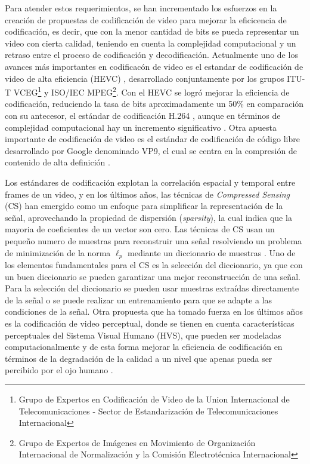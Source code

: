 Para atender estos requerimientos, se han incrementado los esfuerzos en la creaci\'on de propuestas de codificaci\'on de video para mejorar la eficicencia de codificaci\'on, es decir, que con la menor cantidad de bits se pueda representar un video con cierta calidad, teniendo en cuenta la complejidad computacional y un retraso entre el proceso de codificaci\'on y decodificaci\'on. Actualmente uno de los avances m\'as importantes en codificac\'on de video es el estandar de codificaci\'on de video de alta eficiencia (HEVC) \cite{hevc}, desarrollado conjuntamente por los grupos ITU-T VCEG\footnote{Grupo de Expertos en Codificaci\'on de Video de la Union Internacional de Telecomunicaciones - Sector de Estandarizaci\'on de Telecomunicaciones Internacional} y ISO/IEC MPEG\footnote{Grupo de Expertos de Im\'agenes en Movimiento de Organizaci\'on Internacional
de Normalizaci\'on y la Comisi\'on Electrot\'ecnica Internacional}. Con el HEVC se logr\'o mejorar la eficiencia de codificaci\'on, reduciendo la tasa de bits aproximadamente un 50\% en comparaci\'on con su antecesor, el est\'andar de codificaci\'on H.264 \cite{wiegand_overview_2003}, aunque en t\'erminos de complejidad computacional hay un incremento significativo \cite{6317156}. Otra apuesta importante de codificaci\'on de video es el est\'andar de codificaci\'on de c\'odigo libre desarrollado por Google denominado VP9, el cual se centra en la compresi\'on de contenido de alta definici\'on \cite{6737765}.

Los est\'andares de codificaci\'on explotan la correlaci\'on espacial y temporal entre frames de un video, y en los \'ultimos a\~nos, las t\'ecnicas de \textit{Compressed Sensing} (CS) han emergido como un enfoque para simplificar la representaci\'on de la se\~nal, aprovechando la propiedad de dispersi\'on (\textit{sparsity}), la cual indica que la mayoria de coeficientes de un vector son cero. Las t\'ecnicas de CS usan un peque\~no numero de muestras para reconstruir una se\~nal resolviendo un problema de minimizaci\'on de la norma $\ell_p$ mediante un diccionario de muestras \cite{compressive}. Uno de los elementos fundamentales para el CS es la selecci\'on del diccionario, ya que con un buen diccionario se pueden garantizar una mejor reconstrucci\'on de una se\~nal. Para la selecci\'on del diccionario se pueden usar muestras extra\'idas directamente de la se\~nal  o se puede realizar un entrenamiento para que se adapte a las condiciones de la se\~nal. Otra propuesta que ha tomado fuerza en los \'ultimos a\~nos es la codificaci\'on de video perceptual, donde se tienen en cuenta caracter\'isticas perceptuales del Sistema Visual Humano (HVS), que pueden ser modeladas computacionalmente y de esta forma mejorar la eficiencia de codificaci\'on en t\'erminos de la degradaci\'on de la calidad a un nivel que apenas pueda ser percibido por el ojo humano \cite{yu-bei_lin_recent_2013}.

